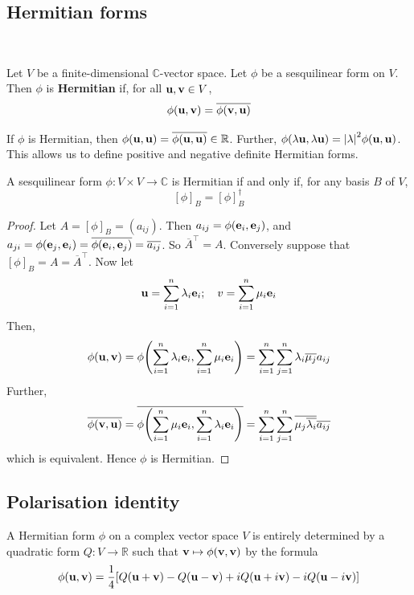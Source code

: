 \documentclass[a4paper,11pt]{article}
\begin{document}
\subsection{Hermitian forms}
\ \vspace*{-1.5em}
\begin{definition}
	Let \( V \) be a finite-dimensional \( \mathbb C \)-vector space.
	Let \( \phi \) be a sesquilinear form on \( V \).
	Then \( \phi \) is \textbf{Hermitian} if, for all \( {\bf u}, {\bf v} \in V \),
	\[
		\phi({\bf u}, {\bf v}) = \overline{\phi({\bf v},{\bf u})}
	\]
\end{definition}
\begin{remark}
	If \( \phi \) is Hermitian, then \( \phi({\bf u},{\bf u}) = \overline{\phi({\bf u},{\bf u})} \in \mathbb R \).
	Further, \( \phi(\lambda {\bf u}, \lambda {\bf u}) = \abs{\lambda}^2 \phi({\bf u},{\bf u}) \).
	This allows us to define positive and negative definite Hermitian forms.
\end{remark}
\begin{lemma}
	A sesquilinear form \( \phi \colon V \times V \to \mathbb C \) is Hermitian if and only if, for any basis \( B \) of \( V \),
	\[
		[\phi]_B = [\phi]_B^\dagger
	\]
\end{lemma}
\begin{proof}
	Let \( A = [\phi]_B = (a_{ij}) \).
	Then \( a_{ij} = \phi({\bf e}_i, {\bf e}_j) \), and \( a_{ji} = \phi({\bf e}_j, {\bf e}_i) = \overline{\phi({\bf e}_i, {\bf e}_j)} = \overline{a_{ij}} \).
	So \( \overline A^\top = A \).
	Conversely suppose that \( [\phi]_B = A = \overline A^\top \).
	Now let
	\[
		{\bf u} = \sum_{i=1}^n \lambda_i {\bf e}_i;\quad v = \sum_{i=1}^n \mu_i {\bf e}_i
	\]
	Then,
	\[
		\phi({\bf u},{\bf v}) = \phi\qty(\sum_{i=1}^n \lambda_i {\bf e}_i, \sum_{i=1}^n \mu_i {\bf e}_i) = \sum_{i=1}^n \sum_{j=1}^n \lambda_i \overline{\mu_j} a_{ij}
	\]
	Further,
	\[
		\overline{\phi({\bf v},{\bf u})} = \overline{\phi\qty(\sum_{i=1}^n \mu_i {\bf e}_i, \sum_{i=1}^n \lambda_i {\bf e}_i)} = \sum_{i=1}^n \sum_{j=1}^n \overline{\mu_j \overline{\lambda_i}} \overline{a_{ij}}
	\]
	which is equivalent.
	Hence \( \phi \) is Hermitian.
\end{proof}

\subsection{Polarisation identity}
A Hermitian form \( \phi \) on a complex vector space \( V \) is entirely determined by a quadratic form \( Q \colon V \to \mathbb R \) such that \( {\bf v} \mapsto \phi({\bf v},{\bf v}) \) by the formula
\[
	\phi({\bf u},{\bf v}) = \frac{1}{4} \qty[ Q({\bf u}+{\bf v}) - Q({\bf u}-{\bf v}) + iQ({\bf u}+i{\bf v}) - iQ({\bf u}-i{\bf v}) ]
\]
\end{document}
